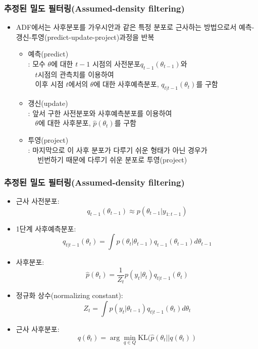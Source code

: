 \documentclass{beamer}
\begin{document}
\begin{frame}
\frametitle{추정된 밀도 필터링(Assumed-density filtering)}
\begin{itemize}

\item {\footnotesize ADF에서는 사후분포를 가우시안과 같은 특정 분포로 근사하는 방법으로서 예측-갱신-투영(predict-update-project)과정을 반복}
    \begin{itemize}
    [circle]
    \item {\footnotesize 예측(predict)
        \\: 모수 $\theta$에 대한 $t-1$ 시점의 사전분포$q_{t-1}(\theta_{t-1})$와 \\
         ~~$t$시점의 관측치를 이용하여 \\
         ~~이후 시점 $t$에서의 $\theta$에 대한 사후예측분포, $q_{t|t-1}(\theta_{t})$를 구함}
    \item {\footnotesize 갱신(update)
        \\: 앞서 구한 사전분포와 사후예측분포를 이용하여
        \\~~$\theta$에 대한 사후분포, $\hat{p}(\theta_t)$를 구함}
    \item {\footnotesize 투영(project)
        \\: 마지막으로 이 사후 분포가 다루기 쉬운 형태가 아닌 경우가
        \\~~ 빈번하기 때문에 다루기 쉬운 분포로 투영(project)}
    \end{itemize}
\end{itemize}
\end{frame}








\begin{frame}
\frametitle{추정된 밀도 필터링(Assumed-density filtering)}

{\footnotesize
    \begin{itemize}
    \item 근사 사전분포:
    $$q_{t-1}(\theta_{t-1}) \approx p(\theta_{t-1}|y_{1:t-1})$$
    \item 1단계 사후예측분포:
    $$q_{t|t-1}(\theta_t) = \int p(\theta_t | \theta_{t-1}) q_{t-1}(\theta_{t-1}) d\theta_{t-1}$$
    \item 사후분포:
    $$\hat{p}(\theta_t) = \frac{1}{Z_t}p(y_t | \theta_t)q_{t|t-1}(\theta_t)$$
    \item 정규화 상수(normalizing constant):
    $$Z_t = \int p(y_t | \theta_{t-1})q_{t|t-1}(\theta_{t})d\theta_{t}$$
    \item 근사 사후분포:
    $$q(\theta_t) = \arg\min_{q \in Q} \mathrm{KL}(\hat{p}(\theta_t || q(\theta_t)) $$
    \end{itemize}
}
\end{frame}
\end{document}
